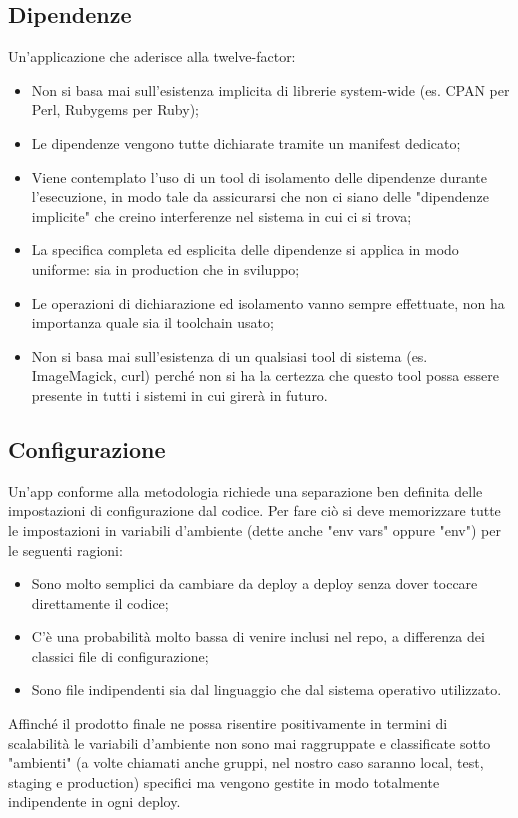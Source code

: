 \documentclass[PianoDiQualifica.tex]{subfiles}
\begin{document}
\subsection{Dipendenze}
Un'applicazione che aderisce alla twelve-factor:
\begin{itemize}
\item Non si basa mai sull'esistenza implicita di librerie system-wide (es. CPAN per Perl, Rubygems per Ruby);
\item Le dipendenze vengono tutte dichiarate tramite un manifest dedicato;
\item Viene contemplato l'uso di un tool di isolamento delle dipendenze durante l'esecuzione, in modo tale da assicurarsi che non ci siano delle "dipendenze implicite" che creino interferenze nel sistema in cui ci si trova;
\item La specifica completa ed esplicita delle dipendenze si applica in modo uniforme: sia in production che in sviluppo;
\item Le operazioni di dichiarazione ed isolamento vanno sempre effettuate, non ha importanza quale sia il toolchain usato;
\item Non si basa mai sull'esistenza di un qualsiasi tool di sistema (es. ImageMagick, curl) perché non si ha la certezza che questo tool possa essere presente in tutti i sistemi in cui girerà in futuro.
\end{itemize}

\subsection{Configurazione}
Un'app conforme alla metodologia richiede una separazione ben definita delle impostazioni di configurazione dal codice.
Per fare ciò si deve memorizzare tutte le impostazioni in variabili d'ambiente (dette anche "env vars" oppure "env") per le seguenti ragioni:
\begin{itemize}
\item Sono molto semplici da cambiare da deploy a deploy senza dover toccare direttamente il codice;
\item C'è una probabilità molto bassa di venire inclusi nel repo, a differenza dei classici file di configurazione;
\item Sono file indipendenti sia dal linguaggio che dal sistema operativo utilizzato.
\end{itemize}
Affinché il prodotto finale ne possa risentire positivamente in termini di scalabilità le variabili d'ambiente non sono mai raggruppate e classificate sotto "ambienti" (a volte chiamati anche gruppi, nel nostro caso saranno local, test, staging e production) specifici ma vengono gestite in modo totalmente indipendente in ogni deploy.
\end{document}
